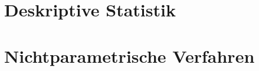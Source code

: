 \documentclass[handout,aspectratio=1610,dvipsnames]{beamer}
\begin{document}
  \section{Deskriptive Statistik}
  \let\woopsi\section\let\section\subsection\let\subsection\subsubsection
  
  \let\subsection\section\let\section\woopsi

  \section{Nichtparametrische Verfahren}
  \let\woopsi\section\let\section\subsection\let\subsection\subsubsection
  
  \let\subsection\section\let\section\woopsi
\end{document}
